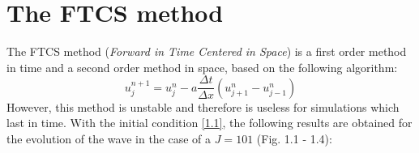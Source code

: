 \documentclass[11pt,a4paper]{article}
\begin{document}
\section{The FTCS method}
The FTCS method (\emph{Forward in Time Centered in Space}) is a first order method in time and a second order method in space, based on the following algorithm:
\begin{equation}
u_j^{n+1} = u_j^n - a\frac{\Delta t}{\Delta x} ( u_{j+1}^n - u_{j-1}^n)
\end{equation}
However, this method is unstable and therefore is useless for simulations which last in time. With the initial condition \eqref{1.1}, the following results are obtained for the evolution of the wave in the case of a $J=101$ (Fig. 1.1 - 1.4):
\begin{figure}[!h]
\centering
{}

\end{figure}
\end{document}
